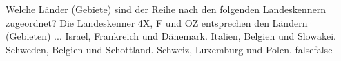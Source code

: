     {Welche Länder (Gebiete) sind der Reihe nach den folgenden Landeskennern zugeordnet? Die Landeskenner 4X, F und OZ entsprechen den Ländern (Gebieten) ...}
    {Israel, Frankreich und Dänemark.}
    {Italien, Belgien und Slowakei.}
    {Schweden, Belgien und Schottland.}
    {Schweiz, Luxemburg und Polen.}
    {false}{false}
